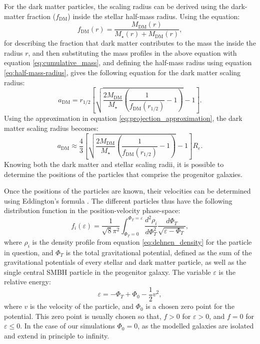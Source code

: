 \documentclass[english, oneside]{HYgradu}
\begin{document}
For the dark matter particles, the scaling radius can be derived using the dark-matter fraction ($f_{\mathrm{DM}}$) inside the stellar half-mass radius. Using the equation:
\begin{equation}
f_\mathrm{DM}(r) = \frac{M_\mathrm{DM}(r)}{M_\star(r) + M_\mathrm{DM}(r)},
\end{equation}
for describing the fraction that dark matter contributes to the mass the inside the radius $r$, and then substituting the mass profiles in the above equation with equation \ref{eq:cumulative_mass}, and defining the half-mass radius using equation \ref{eq:half-mass-radius}, gives the following equation for the dark matter scaling radius:
\begin{equation}
a_\mathrm{DM} =  r_\mathrm{1/2} \left[ \sqrt{\frac{2M_\mathrm{DM}}{M_\star} \left( \frac{1}{f_\mathrm{DM}(r_{1/2})} - 1 \right)} -1 \right].
\end{equation}
Using the approximation in equation \ref{eq:projection_approximation}, the dark matter scaling radius becomes:
\begin{equation}
a_\mathrm{DM} \approx \frac{4}{3} \left[ \sqrt{\frac{2M_\mathrm{DM}}{M_\star} \left( \frac{1}{f_\mathrm{DM}(r_{1/2})} - 1 \right)} -1 \right] R_e.
\end{equation}
Knowing both the dark matter and stellar scaling radii, it is possible to determine the positions of the particles that comprise the progenitor galaxies.

Once the positions of the particles are known, their velocities can be determined using Eddington's formula \citep{BinneyTremaine}. The different particles thus have the following distribution function in the position-velocity phase-space:
\begin{equation}
f_i(\varepsilon) = \frac{1}{\sqrt{8}\pi^2} \int^{\Phi_T = \varepsilon}_{\Phi_T = 0} \frac{d^2\rho_i}{d\Phi^2_T}
\frac{d\Phi_T}{\sqrt{\varepsilon - \Phi_T}}, \label{eq:eddington_form}
\end{equation}
where $\rho_i$ is the density profile from equation \ref{eq:dehnen_density} for the particle in question, and $\Phi_T$ is the total gravitational potential, defined as the sum of the gravitational potentials of every stellar and dark matter particle, as well as the single central SMBH particle in the progenitor galaxy. The variable $\varepsilon$ is the relative energy:
\begin{equation}
\varepsilon = -\Phi_T + \Phi_0 - \frac{1}{2} v^2,
\end{equation}
where $v$ is the velocity of the particle, and $\Phi_0$ is a chosen zero point for the potential. This zero point is usually chosen so that, $f > 0$ for $\varepsilon > 0$, and $f = 0$ for $\varepsilon \leq 0$. In the case of our simulations $\Phi_0 = 0$, as the modelled galaxies are isolated and extend in principle to infinity.
\end{document}
